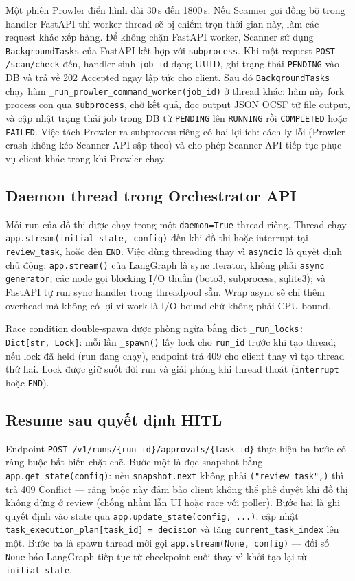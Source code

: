 Một phiên Prowler điển hình dài 30\,s đến 1800\,s. Nếu Scanner gọi đồng bộ trong handler FastAPI thì worker thread sẽ bị chiếm trọn thời gian này, làm các request khác xếp hàng. Để không chặn FastAPI worker, Scanner sử dụng \texttt{BackgroundTasks} của FastAPI kết hợp với \texttt{subprocess}. Khi một request \texttt{POST /scan/check} đến, handler sinh \texttt{job\_id} dạng UUID, ghi trạng thái \texttt{PENDING} vào DB và trả về 202 Accepted ngay lập tức cho client. Sau đó \texttt{BackgroundTasks} chạy hàm \texttt{\_run\_prowler\_command\_worker(job\_id)} ở thread khác: hàm này fork process con qua \texttt{subprocess}, chờ kết quả, đọc output JSON OCSF từ file output, và cập nhật trạng thái job trong DB từ \texttt{PENDING} lên \texttt{RUNNING} rồi \texttt{COMPLETED} hoặc \texttt{FAILED}. Việc tách Prowler ra subprocess riêng có hai lợi ích: cách ly lỗi (Prowler crash không kéo Scanner API sập theo) và cho phép Scanner API tiếp tục phục vụ client khác trong khi Prowler chạy.

\subsection{Daemon thread trong Orchestrator API}

Mỗi run của đồ thị được chạy trong một \texttt{daemon=True} thread riêng. Thread chạy \texttt{app.stream(initial\_state, config)} đến khi đồ thị hoặc interrupt tại \texttt{review\_task}, hoặc đến \texttt{END}. Việc dùng threading thay vì \texttt{asyncio} là quyết định chủ động: \texttt{app.stream()} của LangGraph là sync iterator, không phải \texttt{async generator}; các node gọi blocking I/O thuần (boto3, subprocess, sqlite3); và FastAPI tự run sync handler trong threadpool sẵn. Wrap async sẽ chỉ thêm overhead mà không có lợi vì work là I/O-bound chứ không phải CPU-bound.

Race condition double-spawn được phòng ngừa bằng dict \texttt{\_run\_locks: Dict[str, Lock]}: mỗi lần \texttt{\_spawn()} lấy lock cho \texttt{run\_id} trước khi tạo thread; nếu lock đã held (run đang chạy), endpoint trả 409 cho client thay vì tạo thread thứ hai. Lock được giữ suốt đời run và giải phóng khi thread thoát (\texttt{interrupt} hoặc \texttt{END}).

\subsection{Resume sau quyết định HITL}

Endpoint \texttt{POST /v1/runs/\{run\_id\}/approvals/\{task\_id\}} thực hiện ba bước có ràng buộc bất biến chặt chẽ. Bước một là đọc snapshot bằng \texttt{app.get\_state(config)}: nếu \texttt{snapshot.next} không phải \texttt{("review\_task",)} thì trả 409 Conflict — ràng buộc này đảm bảo client không thể phê duyệt khi đồ thị không dừng ở review (chống nhầm lẫn UI hoặc race với poller). Bước hai là ghi quyết định vào state qua \texttt{app.update\_state(config, ...)}: cập nhật \texttt{task\_execution\_plan[task\_id] = decision} và tăng \texttt{current\_task\_index} lên một. Bước ba là spawn thread mới gọi \texttt{app.stream(None, config)} — đối số \texttt{None} báo LangGraph tiếp tục từ checkpoint cuối thay vì khởi tạo lại từ \texttt{initial\_state}.

